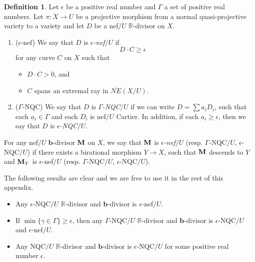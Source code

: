 \documentclass[11pt]{amsart}
\numberwithin{equation}{section}
\newcommand{\bb}{\bm{b}}
\newcommand{\Mm}{{\bf{M}}}
\newcommand{\Rr}{\mathbb{R}}
\newcommand{\Ii}{\Gamma}
\theoremstyle{definition}
\newtheorem{defn}[thm]{Definition}
\theoremstyle{definition}
\theoremstyle{definition}
\begin{document}
\begin{defn}
Let $\epsilon$ be a positive real number and $\Ii$ a set of positive real numbers. Let $\pi: X\rightarrow U$ be a projective morphism from a normal quasi-projective variety to a variety and let $D$ be a nef$/U$ $\Rr$-divisor on $X$.

\begin{enumerate}
    \item ($\epsilon$-nef) We say that $D$ is \emph{$\epsilon$-nef}$/U$ if
    $$D\cdot C\geq\epsilon$$
    for any curve $C$ on $X$ such that 
    \begin{itemize}
        \item $D\cdot C>0$, and
        \item $C$ spans an extremal ray in $\overline{NE}(X/U)$.
    \end{itemize}
    \item ($\Ii$-NQC) We say that $D$ is \emph{$\Ii$-NQC}$/U$ if we can write $D=\sum a_iD_i$, such that each $a_i\in\Ii$ and each $D_i$ is nef$/U$ Cartier. In addition, if each $a_i\geq\epsilon$, then we say that $D$ is \emph{$\epsilon$-NQC$/U$}.
\end{enumerate}
For any nef$/U$ $\bb$-divisor $\Mm$ on $X$, we say that $\Mm$ is \emph{$\epsilon$-nef}$/U$ (resp. $\Ii$-NQC$/U$, $\epsilon$-NQC$/U$) if there exists a birational morphism $Y\rightarrow X$, such that $\Mm$ descends to $Y$ and $\Mm_Y$ is $\epsilon$-nef$/U$ (resp. $\Ii$-NQC$/U$, $\epsilon$-NQC$/U$).

The following results are clear and we are free to use it in the rest of this appendix.
\begin{itemize}
\item  Any $\epsilon$-NQC$/U$ $\Rr$-divisor and $\bb$-divisor is $\epsilon$-nef$/U$.
\item If $\min\{\gamma\in\Ii\}\geq\epsilon$, then any $\Ii$-NQC$/U$ $\Rr$-divisor and $\bb$-divisor is $\epsilon$-NQC$/U$ and $\epsilon$-nef$/U$.
\item Any NQC$/U$ $\Rr$-divisor and $\bb$-divisor is $\epsilon$-NQC$/U$ for some positive real number $\epsilon$.
\end{itemize}
\end{defn}
\end{document}
